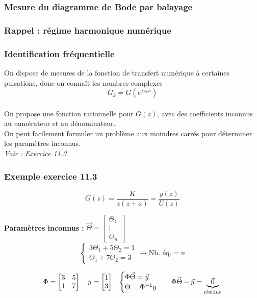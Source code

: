 \documentclass[document.tex]{subfiles}
\begin{document}
\subsubsection{Mesure du diagramme de Bode par balayage}


\subsubsection{Rappel : régime harmonique numérique}

\subsubsection{Identification fréquentielle}

On dispose de mesures de la fonction de transfert numérique à certaines 
pulsations, donc on connaît les nombres complexes $$ G_k = G(e^{j \omega_k h}) $$\\

On propose une fonction rationnelle pour  $G(z)$, avec des coefficients inconnus
au numérateur et au dénominateur.\\

On peut facilement formuler un problème aux moindres carrés pour déterminer
les paramètres inconnus.\\

\textit{Voir : Exercice 11.3}


\subsubsection{Exemple exercice 11.3}

$$
G(z) = \dfrac{K}{z(z+a)}=\dfrac{y(z)}{U(z)}
$$

\textbf{Paramètres inconnus :} $\vec{\Theta}= \begin{bmatrix} \Theta_1 \\ \vdots \\ \Theta_n \end{bmatrix} $\\

$$
\begin{cases} 3\Theta_1 + 5\Theta_2 = 1 \\ \Theta_1 + 7\Theta_2 = 3 \end{cases} \rightarrow \text{Nb. éq.} = n
$$

$$
\begin{array}{l l l}
\Phi = \begin{bmatrix} 3 & 5 \\ 1 & 7 \end{bmatrix} \quad y = \begin{bmatrix} 1 \\ 3 \end{bmatrix} & \begin{cases} \Phi\vec{\Theta} = \vec{y} \\ \Theta = \Phi^{-1} y \end{cases} & \Phi \vec{\Theta} - \vec{y} = \underbrace{\vec{0}}_{\text{résidue}}
\end{array}
$$
\end{document}
